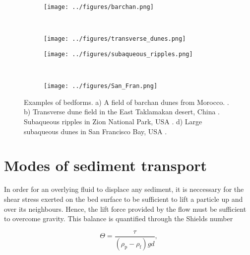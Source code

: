 \documentclass[12pt]{article}
\begin{document}
\begin{figure}
    \centering
    \begin{subfigure}[b]{0.45\textwidth}
        \texttt{[image: ../figures/barchan.png]}
        \caption{}
        \label{fig:barchan}
    \end{subfigure}
    ~ %
    \begin{subfigure}[b]{0.45\textwidth}
        \texttt{[image: ../figures/transverse\_dunes.png]}
        \caption{}
        \label{fig:trans}
    \end{subfigure}

    \begin{subfigure}[b]{0.45\textwidth}
        \texttt{[image: ../figures/subaqueous\_ripples.png]}
        \caption{}
        \label{fig:subaq_rip}
    \end{subfigure}
    ~ %
    \begin{subfigure}[b]{0.45\textwidth}
        \texttt{[image: ../figures/San\_Fran.png]}
        \caption{}
        \label{fig:SF}
    \end{subfigure}

    \caption{Examples of bedforms. a) A field of barchan dunes from Morocco. \citep{Duran11}. b) Transverse dune field in the East Taklamakan desert, China \citep{Gao15}. Subaqueous ripples in Zion National Park, USA \citep{Andreotti12}. d) Large subaqueous dunes in San Francisco Bay, USA \citep{Barnard06}.\label{fig:bedforms}}
\end{figure}

\section{Modes of sediment transport}
\label{sec:sed_trans}

In order for an overlying fluid to displace any sediment, it is neccessary for the shear stress exerted on the bed surface to be sufficient to lift a particle up and over its neighbours. Hence, the lift force provided by the flow must be sufficient to overcome gravity. This balance is quantified through the Shields number

\begin{equation}
\label{equ:Shields}
\Theta = \frac{\tau}{(\rho_{\text{p}} - \rho_{\text{f}}) g d},
\end{equation}
\end{document}
